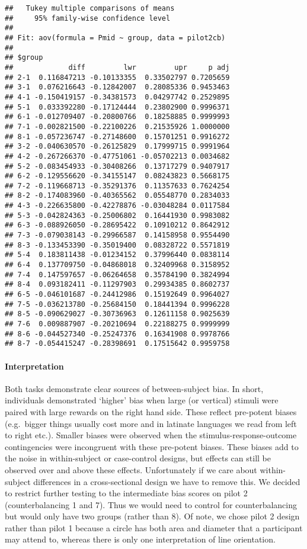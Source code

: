 \documentclass[]{article}
\let\oldparagraph\paragraph
\renewcommand{\paragraph}[1]{\oldparagraph{#1}\mbox{}}
\begin{document}
\begin{verbatim}
##   Tukey multiple comparisons of means
##     95% family-wise confidence level
## 
## Fit: aov(formula = Pmid ~ group, data = pilot2cb)
## 
## $group
##             diff         lwr         upr     p adj
## 2-1  0.116847213 -0.10133355  0.33502797 0.7205659
## 3-1  0.076216643 -0.12842007  0.28085336 0.9453463
## 4-1 -0.150419157 -0.34381573  0.04297742 0.2529895
## 5-1  0.033392280 -0.17124444  0.23802900 0.9996371
## 6-1 -0.012709407 -0.20800766  0.18258885 0.9999993
## 7-1 -0.002821500 -0.22100226  0.21535926 1.0000000
## 8-1 -0.057236747 -0.27148600  0.15701251 0.9916272
## 3-2 -0.040630570 -0.26125829  0.17999715 0.9991964
## 4-2 -0.267266370 -0.47751061 -0.05702213 0.0034682
## 5-2 -0.083454933 -0.30408266  0.13717279 0.9407917
## 6-2 -0.129556620 -0.34155147  0.08243823 0.5668175
## 7-2 -0.119668713 -0.35291376  0.11357633 0.7624254
## 8-2 -0.174083960 -0.40365562  0.05548770 0.2834033
## 4-3 -0.226635800 -0.42278876 -0.03048284 0.0117584
## 5-3 -0.042824363 -0.25006802  0.16441930 0.9983082
## 6-3 -0.088926050 -0.28695422  0.10910212 0.8642912
## 7-3 -0.079038143 -0.29966587  0.14158958 0.9554490
## 8-3 -0.133453390 -0.35019400  0.08328722 0.5571819
## 5-4  0.183811438 -0.01234152  0.37996440 0.0838114
## 6-4  0.137709750 -0.04868018  0.32409968 0.3158952
## 7-4  0.147597657 -0.06264658  0.35784190 0.3824994
## 8-4  0.093182411 -0.11297903  0.29934385 0.8602737
## 6-5 -0.046101687 -0.24412986  0.15192649 0.9964027
## 7-5 -0.036213780 -0.25684150  0.18441394 0.9996228
## 8-5 -0.090629027 -0.30736963  0.12611158 0.9025639
## 7-6  0.009887907 -0.20210694  0.22188275 0.9999999
## 8-6 -0.044527340 -0.25247376  0.16341908 0.9978766
## 8-7 -0.054415247 -0.28398691  0.17515642 0.9959758
\end{verbatim}

\paragraph{Interpretation}\label{interpretation}

Both tasks demonstrate clear sources of between-subject bias. In short,
individuals demonstrated `higher' bias when large (or vertical) stimuli
were paired with large rewards on the right hand side. These reflect
pre-potent biases (e.g.~bigger things usually cost more and in latinate
languages we read from left to right etc.). Smaller biases were observed
when the stimulus-response-outcome contingencies were incongruent with
these pre-potent biases. These biases add to the noise in within-subject
or case-control designs, but effects can still be observed over and
above these effects. Unfortunately if we care about within-subject
differences in a cross-sectional design we have to remove this. We
decided to restrict further testing to the intermediate bias scores on
pilot 2 (counterbalancing 1 and 7). Thus we would need to control for
counterbalancing but would only have two groups (rather than 8). Of
note, we chose pilot 2 design rather than pilot 1 because a circle has
both area and diameter that a participant may attend to, whereas there
is only one interpretation of line orientation.
\end{document}
